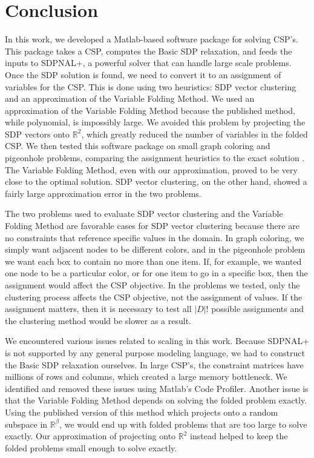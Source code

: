 \documentclass[12pt]{article} %
\begin{document}
\section{Conclusion}

In this work, we developed a Matlab-based software package for solving CSP's. This package takes a CSP, computes the Basic SDP relaxation, and feeds the inputs to SDPNAL+, a powerful solver that can handle large scale problems. Once the SDP solution is found, we need to convert it to an assignment of variables for the CSP. This is done using two heuristics: SDP vector clustering and an approximation of the Variable Folding Method. We used an approximation of the Variable Folding Method because the published method, while polynomial, is impossibly large. We avoided this problem by projecting the SDP vectors onto $\mathbb{R}^2$, which greatly reduced the number of variables in the folded CSP. We then tested this software package on small graph coloring and pigeonhole problems, comparing the assignment heuristics to the exact solution . The Variable Folding Method, even with our approximation, proved to be very close to the optimal solution. SDP vector clustering, on the other hand, showed a fairly large approximation error in the two problems.

The two problems used to evaluate SDP vector clustering and the Variable Folding Method are favorable cases for SDP vector clustering because there are no constraints that reference specific values in the domain. In graph coloring, we simply want adjacent nodes to be different colors, and in the pigeonhole problem we want each box to contain no more than one item. If, for example, we wanted one node to be a particular color, or for one item to go in a specific box, then the assignment would affect the CSP objective. In the problems we tested, only the clustering process affects the CSP objective, not the assignment of values. If the assignment matters, then it is necessary to test all $|D|!$ possible assignments and the clustering method would be slower as a result.

We encountered various issues related to scaling in this work. Because SDPNAL+ is not supported by any general purpose modeling language, we had to construct the Basic SDP relaxation ourselves. In large CSP's, the constraint matrices have millions of rows and columns, which created a large memory bottleneck. We identified and removed these issues using Matlab's Code Profiler. Another issue is that the Variable Folding Method depends on solving the folded problem exactly. Using the published version of this method which projects onto a random subspace in $\mathbb{R}^\beta$, we would end up with folded problems that are too large to solve exactly. Our approximation of projecting onto $\mathbb{R}^2$ instead helped to keep the folded problems small enough to solve exactly.
\end{document}
